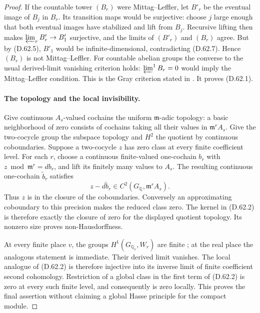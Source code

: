\begin{proof}
If the countable tower \((B_r)\) were Mittag--Leffler,
let \(B'_r\) be the eventual image of \(B_j\) in
\(B_r\). Its transition maps would be surjective:
choose \(j\) large enough that both eventual images
have stabilized and lift from \(B_j\).
Recursive lifting then makes
\(\varprojlim_r B'_r\to B'_1\) surjective, and the
limits of \((B'_r)\) and \((B_r)\) agree. But by
(D.62.5), \(B'_1\) would be infinite-dimensional,
contradicting (D.62.7). Hence \((B_r)\) is not
Mittag--Leffler. For countable abelian groups the
converse to the usual derived-limit vanishing criterion
holds: \(\varprojlim^1 B_r=0\) would imply the
Mittag--Leffler condition. This is the Gray criterion
stated in \cite[Lemma 4.15, printed p.229]{DE_Jannsen1988}.
It proves (D.62.1).

\paragraph{The topology and the local invisibility.}
Give continuous \(A_s\)-valued cochains the uniform
\(\mathfrak m\)-adic topology: a basic neighborhood
of zero consists of cochains taking all their values
in \(\mathfrak m^rA_s\). Give the two-cocycle group
the subspace topology and \(H^2\) the quotient by
continuous coboundaries. Suppose a two-cocycle \(z\)
has zero class at every finite coefficient level.
For each \(r\), choose a continuous finite-valued
one-cochain \(b_r\) with
\(z\bmod\mathfrak m^r=db_r\), and lift its finitely
many values to \(A_s\). The resulting continuous
one-cochain \(\widetilde b_r\) satisfies
\[
                  z-d\widetilde b_r
                       \in C^2(G_{\mathbb Q},\mathfrak m^rA_s).
                                                        \tag{D.62.8}
\]
Thus \(z\) is in the closure of the coboundaries.
Conversely an approximating coboundary to this precision
makes the reduced class zero. The kernel in (D.62.2)
is therefore exactly the closure of zero for the
displayed quotient topology. Its nonzero size proves
non-Hausdorffness.

At every finite place \(v\), the groups
\(H^1(G_{\mathbb Q_v},W_r)\) are finite
\cite[I, Corollary 2.3]{DE_MilneADT}; at the real place
the analogous statement is immediate. Their derived
limit vanishes. The local analogue of (D.62.2) is
therefore injective into its inverse limit of finite
coefficient second cohomology. Restriction of a global
class in the first term of (D.62.2) is zero at every
such finite level, and consequently is zero locally.
This proves the final assertion without claiming a
global Hasse principle for the compact module.
\end{proof}
